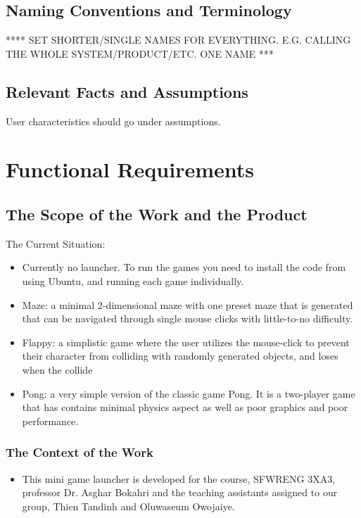 \documentclass[12pt, titlepage]{article}
\begin{document}
\subsection{Naming Conventions and Terminology}

**** SET SHORTER/SINGLE NAMES FOR EVERYTHING. E.G. CALLING THE WHOLE SYSTEM/PRODUCT/ETC. ONE NAME ***

\subsection{Relevant Facts and Assumptions}

User characteristics should go under assumptions.

\section{Functional Requirements}

\subsection{The Scope of the Work and the Product}

The Current Situation:

\begin{itemize}
    \item Currently no launcher. To run the games you need to install the code from using Ubuntu, and running each game individually.
    \item Maze: a minimal 2-dimensional maze with one preset maze that is generated that can be navigated through single mouse clicks with little-to-no difficulty.
    \item Flappy: a simplistic game where the user utilizes the mouse-click to prevent their character from colliding with randomly generated objects, and loses when the collide
    \item Pong: a very simple version of the classic game Pong. It is a two-player game that has contains minimal physics aspect as well as poor graphics and poor performance.
\end{itemize}

\subsubsection{The Context of the Work}
\begin{itemize}
    \item This mini game launcher is developed for the course, SFWRENG 3XA3, professor Dr. Asghar Bokahri and the teaching assistants assigned to our group, Thien Tandinh and Oluwaseum Owojaiye.
\end{itemize}
\end{document}
